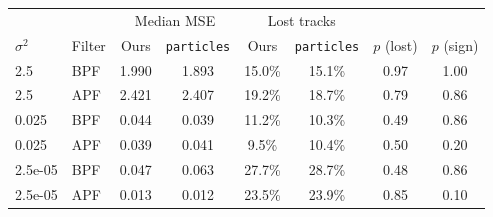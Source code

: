 \begin{tabular}{llcccccc}
\toprule
 & & \multicolumn{2}{c}{Median MSE} & \multicolumn{2}{c}{Lost tracks} & & \\
$\sigma^2$ & Filter & Ours & \texttt{particles} & Ours & \texttt{particles} & $p$ (lost) & $p$ (sign) \\
\midrule
2.5 & BPF & 1.990 & 1.893 & 15.0\% & 15.1\% & 0.97 & 1.00 \\
2.5 & APF & 2.421 & 2.407 & 19.2\% & 18.7\% & 0.79 & 0.86 \\
0.025 & BPF & 0.044 & 0.039 & 11.2\% & 10.3\% & 0.49 & 0.86 \\
0.025 & APF & 0.039 & 0.041 & 9.5\% & 10.4\% & 0.50 & 0.20 \\
2.5e-05 & BPF & 0.047 & 0.063 & 27.7\% & 28.7\% & 0.48 & 0.86 \\
2.5e-05 & APF & 0.013 & 0.012 & 23.5\% & 23.9\% & 0.85 & 0.10 \\
\bottomrule
\end{tabular}
